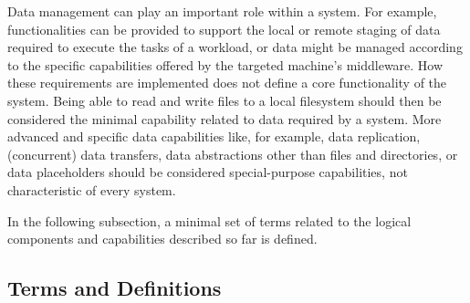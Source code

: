 \documentclass{sig-alternate}
\begin{document}
Data management can play an important role within a \pilotjob system. For
example, functionalities can be provided to support the local or remote staging
of data required to execute the tasks of a workload, or data might be managed
according to the specific capabilities offered by the targeted machine's
middleware. How these requirements are implemented does not define a core
functionality of the \pilot system. Being able to read and write files to a
local filesystem should then be considered the minimal capability related to
data required by a \pilotjob system. More advanced and specific data
capabilities like, for example, data replication, (concurrent) data transfers,
data abstractions other than files and directories, or data placeholders should
be considered special-purpose capabilities, not characteristic of every
\pilotjob system.



In the following subsection, a minimal set of terms related to the logical
components and capabilities described so far is defined.

\subsection{Terms and Definitions}
\label{sec:termsdefs}

\end{document}
